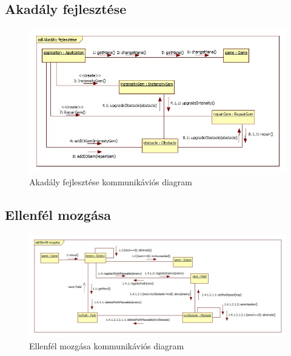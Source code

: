 \subsection{Akadály fejlesztése}
\begin{figure}[H]
\begin{center}
\includegraphics[width=17cm]{chapters/chapter05/images/cd_Akadaly_fejlesztese.jpg}
\caption{Akadály fejlesztése kommunikáviós diagram}
\label{fig:cd_Akadaly_fejlesztese}
\end{center}
\end{figure}

\subsection{Ellenfél mozgása}
\begin{figure}[H]
\begin{center}
\includegraphics[width=17cm]{chapters/chapter05/images/cd_Ellenfel_mozgasa.jpg}
\caption{Ellenfél mozgása kommunikáviós diagram}
\label{fig:cd_Ellenfel_mozgasa}
\end{center}
\end{figure}


